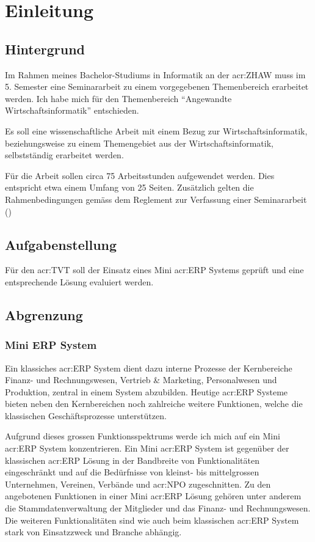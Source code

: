 
\chapter{Einleitung}

\section{Hintergrund}
Im Rahmen meines Bachelor-Studiums in Informatik an der \gls{acr:ZHAW} muss im 5. Semester eine Seminararbeit zu einem vorgegebenen Themenbereich erarbeitet werden. Ich habe mich für den Themenbereich "`Angewandte Wirtschaftsinformatik"' entschieden.

Es soll eine wissenschaftliche Arbeit mit einem Bezug zur Wirtschaftsinformatik, beziehungsweise zu einem Themengebiet aus der Wirtschaftsinformatik, selbstständig erarbeitet werden. 

Für die Arbeit sollen circa 75 Arbeitsstunden aufgewendet werden. Dies entspricht etwa einem Umfang von 25 Seiten. Zusätzlich gelten die Rahmenbedingungen gemäss dem Reglement zur Verfassung einer Seminararbeit (\cite{ZHAW:2012:Seminararbeit:Reglemente})

\section{Aufgabenstellung}
Für den \gls{acr:TVT} soll der Einsatz eines Mini \gls{acr:ERP} Systems geprüft und eine entsprechende Lösung evaluiert werden.

\section{Abgrenzung}
\subsection{Mini ERP System}
Ein klassiches \gls{acr:ERP} System dient dazu interne Prozesse der Kernbereiche Finanz- und Rechnungswesen, Vertrieb \& Marketing, Personalwesen und Produktion, zentral in einem System abzubilden. Heutige \gls{acr:ERP} Systeme bieten neben den Kernbereichen noch zahlreiche weitere Funktionen, welche die klassischen Geschäftsprozesse unterstützen. \cite[S. 486]{Pearson:WirtschaftsInf:LaudonEtAl}

Aufgrund dieses grossen Funktionsspektrums werde ich mich auf ein Mini \gls{acr:ERP} System konzentrieren. Ein Mini \gls{acr:ERP} System ist gegenüber der klassischen \gls{acr:ERP} Lösung in der Bandbreite von Funktionalitäten eingeschränkt und auf die Bedürfnisse von kleinst- bis mittelgrossen Unternehmen, Vereinen, Verbände und \gls{acr:NPO} zugeschnitten. Zu den angebotenen Funktionen in einer Mini \gls{acr:ERP} Lösung gehören unter anderem die Stammdatenverwaltung der Mitglieder und das Finanz- und Rechnungswesen. Die weiteren Funktionalitäten sind wie auch beim klassischen \gls{acr:ERP} System stark von Einsatzzweck und Branche abhängig.

